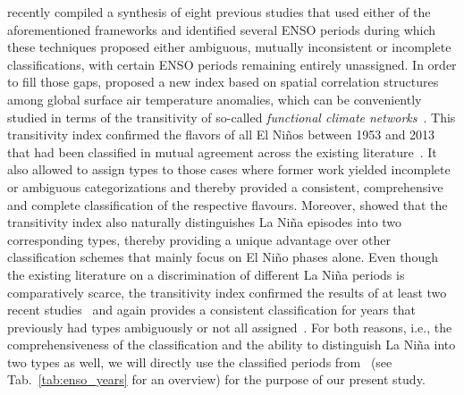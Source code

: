 \documentclass[utf8]{frontiersSCNS} %
\begin{document}
\cite{wiedermann_climate_2016} recently compiled a synthesis of eight previous studies that used either of the aforementioned frameworks and identified several ENSO periods during which these techniques proposed either ambiguous, mutually inconsistent or incomplete classifications, with certain ENSO periods remaining entirely unassigned. In order to fill those gaps, \cite{wiedermann_climate_2016} proposed a new index based on spatial correlation structures among global surface air temperature anomalies, which can be conveniently studied in terms of the transitivity of so-called \textit{functional climate networks}~\citep{tsonis_what_2006,donner_complex_2017}. This transitivity index confirmed the flavors of all El Ni\~nos between 1953 and 2013 that had been classified in mutual agreement across the existing literature~\citep{wiedermann_climate_2016}. It also allowed to assign types to those cases where former work yielded incomplete or ambiguous categorizations and thereby provided a consistent, comprehensive and complete classification of the respective flavours. Moreover, \cite{wiedermann_climate_2016} showed that the transitivity index also naturally distinguishes La Ni\~na episodes into two corresponding types, thereby providing a unique advantage over other classification schemes that mainly focus on El Ni\~no phases alone. Even though the existing literature on a discrimination of different La Niña periods is comparatively scarce, the transitivity index confirmed the results of at least two recent studies~\citep{yuan2013different, tedeschi2013influences} and again provides a consistent classification for years that previously had types ambiguously or not all assigned~\citep{wiedermann_climate_2016}. 
For both reasons, i.e., the comprehensiveness of the classification and the ability to distinguish La Ni\~na into two types as well, we will directly use the classified periods from~\cite{wiedermann_climate_2016} (see Tab.~\ref{tab:enso_years} for an overview) for the purpose of our present study. 

\end{document}
